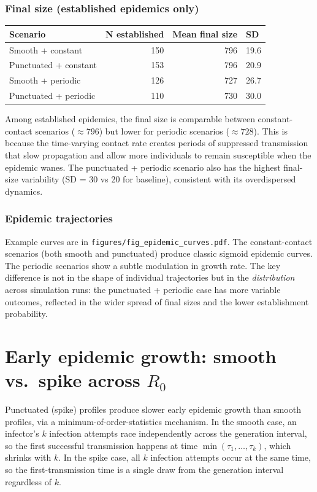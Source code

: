 \documentclass[11pt]{article}
\begin{document}
\subsubsection{Final size (established epidemics only)}

\medskip
\begin{tabular}{lrrl}
\toprule
Scenario & N established & Mean final size & SD \\
\midrule
Smooth + constant     & 150 & 796 & 19.6 \\
Punctuated + constant & 153 & 796 & 20.9 \\
Smooth + periodic     & 126 & 727 & 26.7 \\
Punctuated + periodic & 110 & 730 & 30.0 \\
\bottomrule
\end{tabular}
\medskip

Among established epidemics, the final size is comparable between constant-contact scenarios ($\approx 796$) but lower for periodic scenarios ($\approx 728$). This is because the time-varying contact rate creates periods of suppressed transmission that slow propagation and allow more individuals to remain susceptible when the epidemic wanes. The punctuated + periodic scenario also has the highest final-size variability (SD = 30 vs 20 for baseline), consistent with its overdispersed dynamics.

\subsubsection{Epidemic trajectories}

Example curves are in \texttt{figures/fig\_epidemic\_curves.pdf}. The constant-contact scenarios (both smooth and punctuated) produce classic sigmoid epidemic curves. The periodic scenarios show a subtle modulation in growth rate. The key difference is not in the shape of individual trajectories but in the \textit{distribution} across simulation runs: the punctuated + periodic case has more variable outcomes, reflected in the wider spread of final sizes and the lower establishment probability.

\section{Early epidemic growth: smooth vs.\ spike across $R_0$}

Punctuated (spike) profiles produce slower early epidemic growth than smooth profiles, via a minimum-of-order-statistics mechanism. In the smooth case, an infector's $k$ infection attempts race independently across the generation interval, so the first successful transmission happens at time $\min(\tau_1, \ldots, \tau_k)$, which shrinks with $k$. In the spike case, all $k$ infection attempts occur at the same time, so the first-transmission time is a single draw from the generation interval regardless of $k$.
\end{document}
